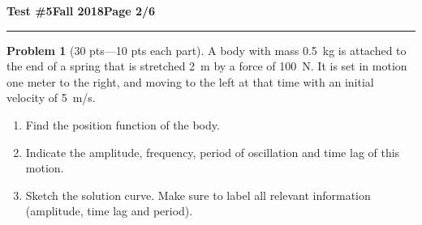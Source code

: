 \documentclass[12pt]{article}
\theoremstyle{definition}
\newtheorem{problem}{Problem}
\begin{document}
\hfill{\large\bf Test \#5}\hfill{\large\bf Fall 2018}\hfill{\large\bf Page 2/6}\hrule

\bigskip
\begin{problem}[30 pts---10 pts each part]
  A body with mass 0.5~kg is attached to the end of a spring that is stretched 2~m by a force of 100~N.  It is set in
  motion one meter to the right, and moving to the left at that time with an initial velocity of 5~m/s.
  \begin{enumerate}
  \item Find the position function of the body.
    \vspace{3cm}
    \begin{flushright}
    \end{flushright}
  \item Indicate the amplitude, frequency, period of oscillation and time lag of this motion.
    \vspace{3cm}
    \begin{flushright}
    \end{flushright}
  \item Sketch the solution curve.  Make sure to label all relevant information (amplitude, time lag and period).
  \end{enumerate}
\end{problem} 
\end{document}
